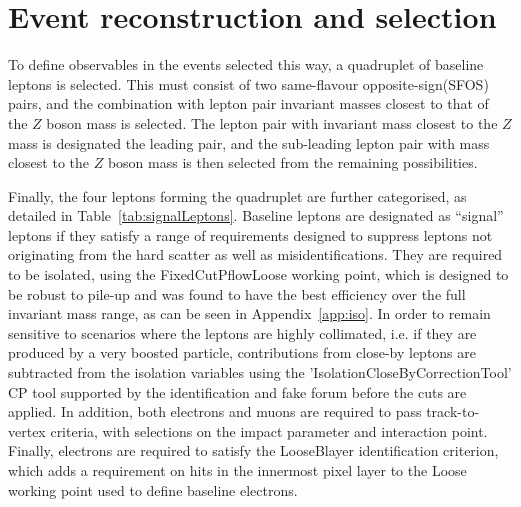\section{Event reconstruction and selection}


To define observables in the events selected this way, a quadruplet of baseline leptons is selected. 
This must consist of two same-flavour opposite-sign(SFOS) pairs, and the combination with lepton pair invariant masses closest to that of the $Z$ boson mass is selected. The lepton pair with invariant mass closest to the $Z$ mass is designated the leading pair, and the sub-leading lepton pair with mass closest to the $Z$ boson mass is then selected from the remaining possibilities.

Finally, the four leptons forming the quadruplet are further categorised, as detailed in Table~\ref{tab:signalLeptons}. 
Baseline leptons are designated as ``signal'' leptons if they satisfy a range of requirements designed to suppress leptons not originating from the hard scatter as well as misidentifications.
They are required to be isolated, using the FixedCutPflowLoose working point, which is designed to be robust to pile-up and was found to have the best efficiency over the full invariant mass range, as can be seen in Appendix~\ref{app:iso}. In order to remain sensitive to scenarios where the leptons are highly collimated, i.e. if they are produced by a very boosted particle, contributions from close-by leptons are subtracted from the isolation variables using the 'IsolationCloseByCorrectionTool' CP tool supported by the identification and fake forum before the cuts are applied. In addition, both electrons and muons are required to pass track-to-vertex criteria, with selections on the impact parameter and interaction point. Finally, electrons are required to satisfy the LooseBlayer identification criterion, which adds a requirement on hits in the innermost pixel layer to the Loose working point used to define baseline electrons. 

